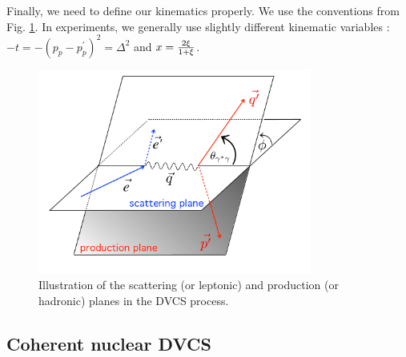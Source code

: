 \documentclass[aps,prc,preprint,superscriptaddress]{revtex4}
\begin{document}
Finally, we need to define our kinematics properly. We use the 
conventions from Fig. \ref{fig:PhiAngle}. 
In experiments, we generally use slightly different kinematic variables : 
$-t = -(p_p-p_p^\prime)^2 = \Delta^2$ and 
$x = {2\xi \over 1+\xi}$. 

\begin{figure}[tbp!]
\center
\includegraphics[width=9cm]{fig1/finalplane.png}
	\caption{Illustration of the scattering (or leptonic) and production (or hadronic) planes
	in the DVCS process.} %
\label{fig:PhiAngle}
\end{figure}



\subsection{Coherent nuclear DVCS}
\end{document}
